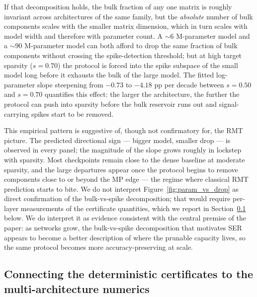 \documentclass[11pt]{article}
\theoremstyle{plain}
\theoremstyle{definition}
\theoremstyle{remark}
\newcommand{\1}{\mathbf{1}}
\begin{document}
If that decomposition holds, the bulk fraction of any one matrix is roughly invariant across architectures of the same family, but the \emph{absolute} number of bulk components scales with the smaller matrix dimension, which in turn scales with model width and therefore with parameter count.  A \(\sim 6\) M-parameter model and a \(\sim 90\) M-parameter model can both afford to drop the same fraction of bulk components without crossing the spike-detection threshold; but at high target sparsity (\(s=0.70\)) the protocol is forced into the spike subspace of the small model long before it exhausts the bulk of the large model.  The fitted log-parameter slope steepening from \(-0.73\) to \(-4.18\) pp per decade between \(s=0.50\) and \(s=0.70\) quantifies this effect: the larger the architecture, the further the protocol can push into sparsity before the bulk reservoir runs out and signal-carrying spikes start to be removed.

This empirical pattern is suggestive of, though not confirmatory for, the RMT picture.  The predicted directional sign --- bigger model, smaller drop --- is observed in every panel; the magnitude of the slope grows roughly in lockstep with sparsity.  Most checkpoints remain close to the dense baseline at moderate sparsity, and the large departures appear once the protocol begins to remove components close to or beyond the MP edge --- the regime where classical RMT prediction starts to bite.  We do not interpret Figure~\ref{fig:param_vs_drop} as direct confirmation of the bulk-vs-spike decomposition; that would require per-layer measurements of the certificate quantities, which we report in Section~\ref{subsec:theory_numerics_alignment} below.  We do interpret it as evidence consistent with the central premise of the paper: as networks grow, the bulk-vs-spike decomposition that motivates SER appears to become a better description of where the prunable capacity lives, so the same protocol becomes more accuracy-preserving at scale.

\subsection{Connecting the deterministic certificates to the multi-architecture numerics}
\label{subsec:theory_numerics_alignment}
\end{document}
